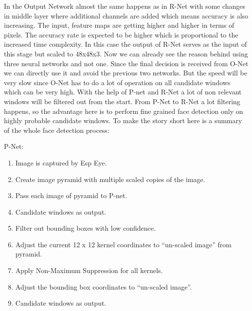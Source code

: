 In the Output Network almost the same happens as in R-Net with some changes in middle layer where additional channels are added which means accuracy is also increasing. The input, feature maps are getting higher and higher in terms of pixels. The accuracy rate is expected to be higher which is proportional to the increased time complexity. In this case the output of R-Net serves as the input of this stage but scaled to 48x48x3. 
Now we can already see the reason behind using three neural networks and not one. Since the final decision is received from O-Net we can directly use it and avoid the previous two networks. But the speed will be very slow since O-Net has to do a lot of operation on all candidate windows which can be very high. With the help of P-net and R-Net a lot of non relevant windows will be filtered out from the start. From P-Net to R-Net a lot filtering happens, so the advantage here is to perform fine grained face detection only on highly probable candidate windows. To make the story short here is a summary of the whole face detection process: 
 
 P-Net:
\begin{enumerate}
  \vspace{-0.7cm} \item Image is captured by Esp Eye.
  \vspace{-0.3cm}\item Create image pyramid with multiple scaled copies of the image.
  \vspace{-0.3cm} \item Pass each image of pyramid to P-net.
  \vspace{-0.3cm} \item Candidate windows as output.
  \vspace{-0.3cm} \item Filter out bounding boxes with low confidence.
  \vspace{-0.3cm} \item Adjust the current 12 x 12 kernel coordinates to “un-scaled image” from pyramid.
  \vspace{-0.3cm} \item Apply Non-Maximum Suppression for all kernels.
   \vspace{-0.3cm} \item Adjust the bounding box coordinates to “un-scaled image”.
   \vspace{-0.3cm} \item Candidate windows as output.
\end{enumerate}

